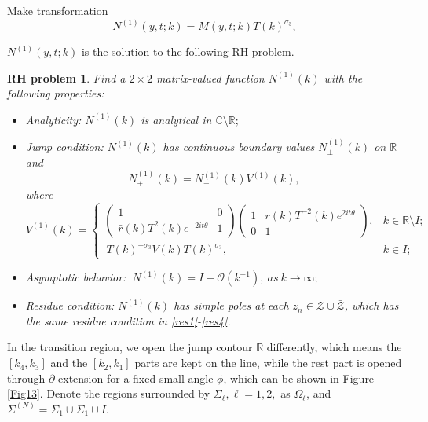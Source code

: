 \documentclass[11pt]{article}
\numberwithin{equation}{section}
\newtheorem{RHP}{RH problem}
\begin{document}
Make transformation
\begin{equation}\label{eq44}
    N^{(1)}(y,t;k)=M(y,t;k)T(k)^{\sigma_3},
\end{equation}

$N^{(1)}(y,t;k)$ is the solution to the following RH problem.

\begin{RHP}
    Find a $2\times 2$ matrix-valued function $N^{(1)}(k)$ with the following properties:
\begin{itemize}
  \item Analyticity: $N^{(1)}(k)$ is analytical in $\mathbb{C}\setminus\mathbb{R};$

  \item Jump condition: $N^{(1)}(k)$ has continuous boundary values $N^{(1)}_{\pm}(k)$ on $\mathbb{R}$ and
 \begin{equation}
N^{(1)}_+(k)=N^{(1)}_-(k)V^{(1)}(k),
\end{equation}
where
\begin{equation}
V^{(1)}(k)=\begin{cases}
    \left(\begin{array}{cc}1&0\\ \bar{r}(k)T^2(k)e^{-2it\theta}&1\end{array}\right)\left(\begin{array}{cc}1&r(k)T^{-2}(k)e^{2it\theta}\\ 0&1\end{array}\right), &k\in \mathbb{R}\setminus I;\\
\ T(k)^{-\sigma_3}V(k)T(k)^{\sigma_3}, &k\in I;
\end{cases}
\end{equation}


  \item Asymptotic behavior:
  $\ N^{(1)}(k)=I+\mathcal{O}(k^{-1}),\ as \ k\to \infty;$
\item Residue condition: $N^{(1)}(k)$ has simple poles at each $z_n\in\mathcal{Z}\cup\bar{\mathcal{Z}}$, which  has the same residue condition in \eqref{res1}-\eqref{res4}.
\end{itemize}
\end{RHP}



In the transition region, we open the jump contour $\mathbb{R}$ differently, which means the $[k_4,k_3]$ and the $[k_2,k_1]$ parts are kept on the line, while the rest part is opened through $\bar{\partial}$ extension for a fixed small angle $\phi$, which can be shown in Figure \ref{Fig13}. Denote the regions surrounded by $\Sigma_\ell,\ell=1,2,$ as $\Omega_\ell$, and $\Sigma^{(N)}=\Sigma_1\cup\Sigma_1\cup I$.
\end{document}
